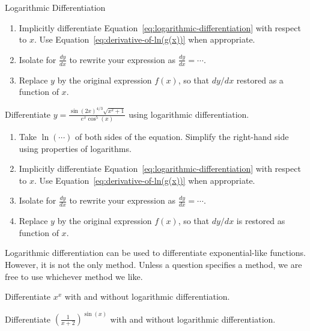 \documentclass[../main.tex]{subfiles}
\begin{document}
\begin{lesson}{Logarithmic Differentiation}
\begin{enumerate}
    \item Implicitly differentiate Equation~\eqref{eq:logarithmic-differentiation} with respect to \(x\). Use Equation~\eqref{eq:derivative-of-ln(g(x))} when appropriate.

    \item Isolate for \(\frac{dy}{dx}\) to rewrite your expression as \(\frac{dy}{dx} = \cdots\). 
    \item Replace \(y\) by the original expression \(f(x)\), so that \(dy/dx\) restored as a function of \(x\).
  \end{enumerate}
  \clearpage

  \begin{example} \label{ex:log-diff}
    Differentiate \(y = \frac{\sin(2x)^{4/3} \sqrt{x^{2}+1}}{e^{x} \cos^{5}(x)}\) using logarithmic differentiation.

    \begin{enumerate}
      \item Take \(\ln(\cdots{})\) of both sides of the equation. Simplify the right-hand side using properties of logarithms.
      \item Implicitly differentiate Equation~\eqref{eq:logarithmic-differentiation} with respect to \(x\). Use Equation~\eqref{eq:derivative-of-ln(g(x))} when appropriate.
      \item Isolate for \(\frac{dy}{dx}\) to rewrite your expression as \(\frac{dy}{dx} = \cdots\). 
      \item Replace \(y\) by the original expression \(f(x)\), so that \(dy/dx\) is restored as function of \(x\).
    \end{enumerate}
  \end{example}

  Logarithmic differentiation can be used to differentiate exponential-like functions.  However, it is not the only method. Unless a question specifies a method, we are free to use whichever method we like.
  \begin{example}
    Differentiate \(x^{x}\) with and without logarithmic differentiation.

  \end{example}

  \clearpage

  \begin{example}
    Differentiate \(\left( \frac{1}{x+2} \right)^{\sin(x)}\) with and without logarithmic differentiation.
  \end{example}


\end{lesson}
\end{document}
